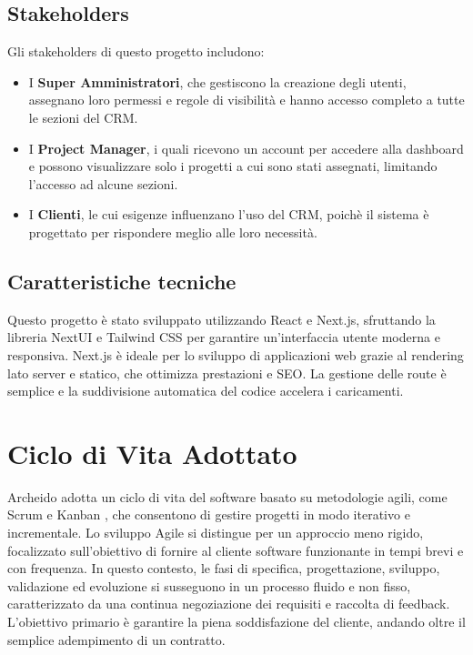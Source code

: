 \documentclass[target=bach,aauheader=,style=]{thud}
\begin{document}
\subsection{Stakeholders}
Gli stakeholders di questo progetto includono:

\begin{itemize}
    \item I \textbf{Super Amministratori}, che gestiscono la creazione degli utenti, assegnano loro permessi e regole di visibilità e hanno accesso completo a tutte le sezioni del CRM. 
    \item I \textbf{Project Manager}, i quali ricevono un account per accedere alla dashboard e possono visualizzare solo i progetti a cui sono stati assegnati, limitando l'accesso ad alcune sezioni.
    \item I \textbf{Clienti}, le cui esigenze influenzano l'uso del CRM, poichè il sistema è progettato per rispondere meglio alle loro necessità.
\end{itemize}

\subsection{Caratteristiche tecniche}
Questo progetto è stato sviluppato utilizzando React e Next.js, sfruttando la libreria NextUI e Tailwind CSS per garantire un'interfaccia utente moderna e responsiva. Next.js \cite{nextjs2024} è ideale per lo sviluppo di applicazioni web grazie al rendering lato server e statico, che ottimizza prestazioni e SEO. La gestione delle route è semplice e la suddivisione automatica del codice accelera i caricamenti.

\section{Ciclo di Vita Adottato}
Archeido adotta un ciclo di vita del software basato su metodologie agili, come Scrum \cite{scrumwiki2024} e Kanban \cite{kanbanwiki2024}, che consentono di gestire progetti in modo iterativo e incrementale. Lo sviluppo Agile si distingue per un approccio meno rigido, focalizzato sull'obiettivo di fornire al cliente software funzionante in tempi brevi e con frequenza. In questo contesto, le fasi di specifica, progettazione, sviluppo, validazione ed evoluzione si susseguono in un processo fluido e non fisso, caratterizzato da una continua negoziazione dei requisiti e raccolta di feedback. L'obiettivo primario è garantire la piena soddisfazione del cliente, andando oltre il semplice adempimento di un contratto.
\end{document}
